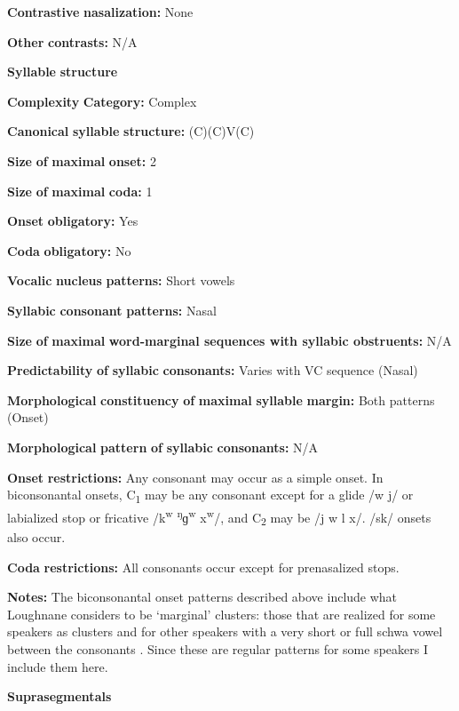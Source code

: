 \textbf{Contrastive} \textbf{nasalization:} None

\textbf{Other} \textbf{contrasts:} N/A

\textbf{Syllable} \textbf{structure}

\textbf{Complexity} \textbf{Category:} Complex

\textbf{Canonical} \textbf{syllable} \textbf{structure:} (C)(C)V(C) \citep[63-73]{Loughnane2009}

\textbf{Size} \textbf{of} \textbf{maximal} \textbf{onset:} 2

\textbf{Size} \textbf{of} \textbf{maximal} \textbf{coda:} 1

\textbf{Onset} \textbf{obligatory:} Yes

\textbf{Coda} \textbf{obligatory:} No

\textbf{Vocalic} \textbf{nucleus} \textbf{patterns:} Short vowels

\textbf{Syllabic} \textbf{consonant} \textbf{patterns:} Nasal

\textbf{Size} \textbf{of} \textbf{maximal} \textbf{word{}-marginal sequences with syllabic obstruents:} N/A

\textbf{Predictability} \textbf{of} \textbf{syllabic} \textbf{consonants:} Varies with VC sequence (Nasal)

\textbf{Morphological} \textbf{constituency} \textbf{of} \textbf{maximal} \textbf{syllable} \textbf{margin:} Both patterns (Onset)

\textbf{Morphological} \textbf{pattern} \textbf{of} \textbf{syllabic} \textbf{consonants:} N/A

\textbf{Onset} \textbf{restrictions:} Any consonant may occur as a simple onset. In biconsonantal onsets, C\textsubscript{1} may be any consonant except for a glide /w j/ or labialized stop or fricative /k\textsuperscript{w} \textsuperscript{ŋ}ɡ\textsuperscript{w} x\textsuperscript{w}/, and C\textsubscript{2} may be /j w l x/. /sk/ onsets also occur.

\textbf{Coda} \textbf{restrictions:} All consonants occur except for prenasalized stops.

\textbf{Notes:} The biconsonantal onset patterns described above include what Loughnane considers to be ‘marginal’ clusters: those that are realized for some speakers as clusters and for other speakers with a very short or full schwa vowel between the consonants \citep[64-5]{Loughnane2009}. Since these are regular patterns for some speakers I include them here.

\textbf{Suprasegmentals}


